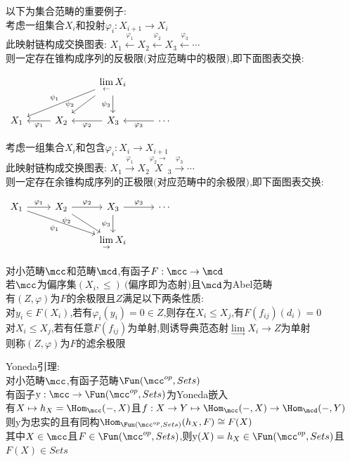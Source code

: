 \begin{zhu}
以下为集合范畴的重要例子:\\
考虑一组集合$X_{i}$和投射$\varphi_{i}:X_{i+1}\to X_{i}$\\
此映射链构成交换图表: $X_1\stackrel{\varphi_{1}}{\leftarrow}X_2\stackrel{\varphi_{2}}{\leftarrow}X_3\stackrel{\varphi_{3}}{\leftarrow}\cdots$\\
则一定存在锥构成序列的反极限$($对应范畴中的极限$)$,即下面图表交换:
\begin{center}
    $\begin{tikzcd}
     & & \lim\limits_{\leftarrow}X_i \ar[dll,"\psi_1"'] \ar[dl,"\psi_2"',pos=0.8] \ar[d,"\psi_3"'] & \\
    X_1 & X_2 \ar[l,"\varphi_{1}"] & X_3 \ar[l,"\varphi_{2}"] & \cdots \ar[l,"\varphi_{3}"]
    \end{tikzcd}$
\end{center}
考虑一组集合$X_{i}$和包含$\varphi_{i}:X_{i}\to X_{i+1}$\\
此映射链构成交换图表: $X_1\stackrel{\varphi_{1}}{\rightarrow}X_2\stackrel{\varphi_{2}{\rightarrow}}X_3\stackrel{\varphi_{3}}{\rightarrow}\cdots$\\
则一定存在余锥构成序列的正极限$($对应范畴中的余极限$)$,即下面图表交换:
\begin{center}
    $\begin{tikzcd}
    X_1 \ar[r,"\varphi_{1}"] \ar[drr,"\psi_1"'] & X_2 \ar[r,"\varphi_{2}"] \ar[dr,"\psi_2"',pos=0.05] & X_3 \ar[r,"\varphi_{3}"] \ar[d,"\psi_3"'] & \cdots\\
     & & \lim\limits_{\rightarrow}X_i & 
    \end{tikzcd}$
\end{center}
\end{zhu}

\begin{dingyi}
对小范畴$\mcc$和范畴$\mcd$,有函子$F:\mcc \to \mcd$\\    
若$\mcc$为偏序集$(X_i,\leq)\ ($偏序即为态射$)$且$\mcd$为Abel范畴\\
有$(Z,\varphi)$为$F$的余极限且$Z$满足以下两条性质:\\
对$y_i\in F(X_i)$,若有$\varphi_{i}(y_{i})=0\in Z$,则存在$X_i\leq X_j$,有$F(f_{ij})(d_i)=0$\\
对$X_i\leq X_j$,若有任意$F(f_{ij})$为单射,则诱导典范态射$\lim\limits_{\rightarrow}X_{i}\to Z$为单射\\
则称$(Z,\varphi)$为$F$的滤余极限
\end{dingyi}

\begin{dingli}
Yoneda引理:\\
对小范畴$\mcc$,有函子范畴$\Fun(\mcc^{op},Sets)$\\
有函子$\mathrm{y}:\mcc\to\Fun(\mcc^{op},Sets)$为Yoneda嵌入\\
有$X\mapsto h_{X}=\Hom_{\mcc}(-,X)$且$f:X\to Y\mapsto \Hom_{\mcc}(-,X)\to\Hom_{\mcd}(-,Y)$\\
则$\mathrm{y}$为忠实的且有同构$\Hom_{\Fun(\mcc^{op},Sets)}(h_{X},F)\cong F(X)$\\
其中$X\in \mcc$且$F\in\Fun(\mcc^{op},Sets)$,则$\mathrm{y}(X)=h_{X}\in \Fun(\mcc^{op},Sets)$且$F(X)\in Sets$
\end{dingli}

%